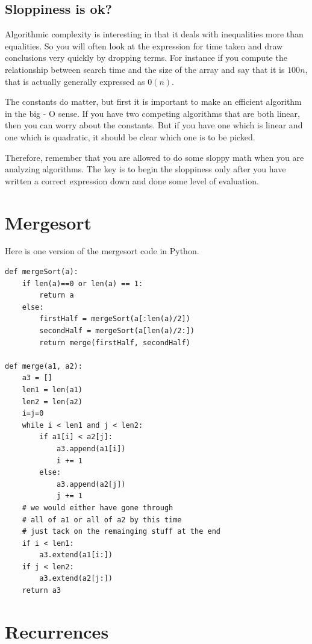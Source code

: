 \documentclass[12pt]{article}
\begin{document}
\subsection*{Sloppiness is ok?}

Algorithmic complexity is interesting in that it deals with inequalities more than equalities. So you will often look at the expression for time taken and draw conclusions very quickly by dropping terms. For instance if you compute the relationship between search time and the size of the array and say that it is $100n$, that is actually generally expressed as $0(n)$. 

The constants do matter, but first it is important to make an efficient algorithm in the big - O sense. If you have two competing algorithms that are both linear, then you can worry about the constants. But if you have one which is linear and one which is quadratic, it should be clear which one is to be picked.

Therefore, remember that you are allowed to do some sloppy math when you are analyzing algorithms. The key is to begin the sloppiness only after you have written a correct expression down and done some level of evaluation.


\section*{Mergesort}

Here is one version of the mergesort code in Python. 

\begin{verbatim}
def mergeSort(a):
    if len(a)==0 or len(a) == 1:
        return a
    else:
        firstHalf = mergeSort(a[:len(a)/2])
        secondHalf = mergeSort(a[len(a)/2:])
        return merge(firstHalf, secondHalf)

def merge(a1, a2):
    a3 = []
    len1 = len(a1)
    len2 = len(a2)
    i=j=0
    while i < len1 and j < len2:
        if a1[i] < a2[j]:
            a3.append(a1[i])
            i += 1
        else:
            a3.append(a2[j])
            j += 1
    # we would either have gone through
    # all of a1 or all of a2 by this time
    # just tack on the remainging stuff at the end
    if i < len1:
        a3.extend(a1[i:])
    if j < len2:
        a3.extend(a2[j:])
    return a3
\end{verbatim}

\section*{Recurrences}
\end{document}
